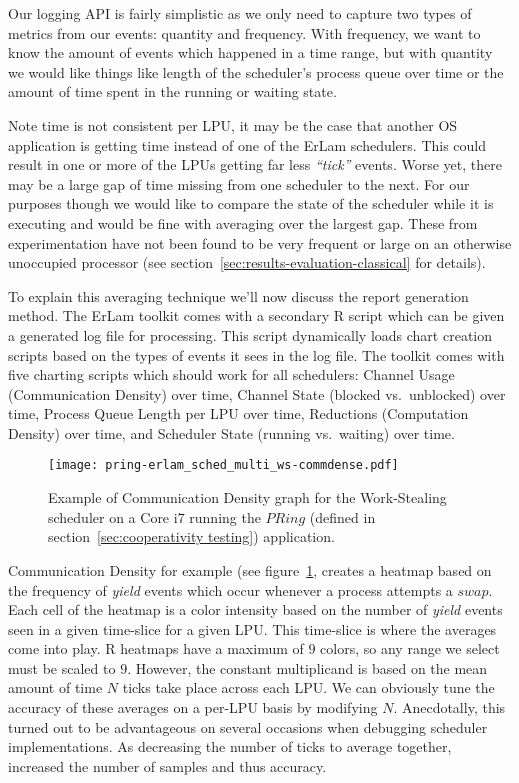 Our logging API is fairly simplistic as we only need to capture two types of metrics
from our events: quantity and frequency. With frequency, we want to know the
amount of events which happened in a time range, but with quantity we would like 
things like length of the scheduler's process queue over time or the amount of
time spent in the running or waiting state.

Note time is not consistent per LPU, it may be the case that another OS 
application is getting time instead of one of the ErLam schedulers. This could
result in one or more of the LPUs getting far less \emph{``tick''} events. Worse
yet, there may be a large gap of time missing from one scheduler to the next.
For our purposes though we would like to compare the state of the scheduler
while it is executing and would be fine with averaging over the largest gap. These
from experimentation have not been found to be very frequent or large on an
otherwise unoccupied processor (see section~\ref{sec:results-evaluation-classical} 
for details).

To explain this averaging technique we'll now discuss the report generation 
method. The ErLam toolkit comes with a secondary R script which can be given a 
generated log file for processing. This script dynamically loads chart 
creation scripts based on the types of events it sees in the log file. The
toolkit comes with five charting scripts which should work for all schedulers: 
Channel Usage (Communication Density) over time,
Channel State (blocked vs.~unblocked) over time,
Process Queue Length per LPU over time,
Reductions (Computation Density) over time, and
Scheduler State (running vs.~waiting) over time.

\begin{figure}
\centering
\texttt{[image: pring-erlam\_sched\_multi\_ws-commdense.pdf]}
\caption{ Example of Communication Density graph for the Work-Stealing scheduler 
on a Core i7 running the $PRing$ (defined in section~\ref{sec:cooperativity testing})
application.}
\label{fig:commdense-example}
\end{figure}

Communication Density for example (see figure~\ref{fig:commdense-example}, 
creates a heatmap based on the frequency of
\emph{yield} events which occur whenever a process attempts a $swap$. Each cell
of the heatmap is a color intensity based on the number of \emph{yield} events 
seen in a given time-slice for a given LPU. This time-slice is where the averages
come into play. R heatmaps have a maximum of $9$ colors, so any range we 
select must be scaled to $9$. However, the constant multiplicand is based on the
mean amount of time $N$ ticks take place across each LPU.
We can obviously tune the accuracy of these averages on a per-LPU basis by
modifying $N$. Anecdotally, this turned out to be advantageous on several 
occasions when debugging scheduler implementations. As decreasing the number of
ticks to average together, increased the number of samples and thus accuracy.

